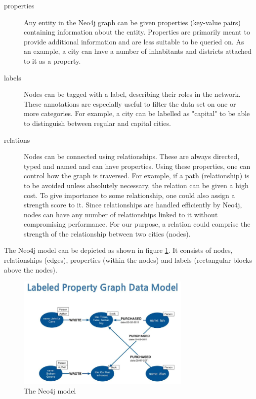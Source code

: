 \begin{description}
\item[properties] Any entity in the Neo4j graph can be given properties (key-value pairs) containing information about the entity. Properties are primarily meant to provide additional information and are less suitable to be queried on. As an example, a city can have a number of inhabitants and districts attached to it as a property.
\item[labels] Nodes can be tagged with a label, describing their roles in the network. These annotations are especially useful to filter the data set on one or more categories. For example, a city can be labelled as "capital" to be able to distinguish between regular and capital cities.
\item[relations] Nodes can be connected using relationships. These are always directed, typed and named and can have properties. Using these properties, one can control how the graph is traversed. For example, if a path (relationship) is to be avoided unless absolutely necessary, the relation can be given a high cost. To give importance to some relationship, one could also assign a strength score to it. Since relationships are handled efficiently by Neo4j, nodes can have any number of relationships linked to it without compromising performance. For our purpose, a relation could comprise the strength of the relationship between two cities (nodes).
\end{description}

The Neo4j model can be depicted as shown in figure \ref{fig:neo4j}. It consists of nodes, relationships (edges), properties (within the nodes) and labels (rectangular blocks above the nodes).

\begin{figure}
\centering
\includegraphics[width=0.75\textwidth]{neo4j}
\caption{The Neo4j model \protect\footnotemark{}}
\label{fig:neo4j}
\end{figure}

